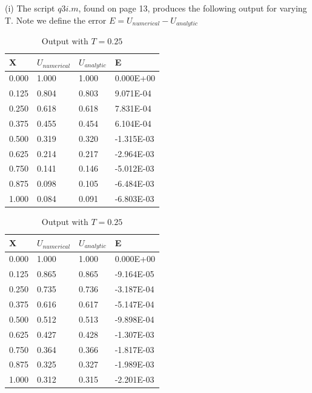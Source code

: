 \documentclass[10pt,a4paper]{report}
\begin{document}
(i) The script $q3i.m$, found on page 13, produces the following output for varying T. Note we define the error $E=U_{numerical}-U_{analytic}$
\begin{table}[h]
\begin{minipage}[b]{0.5\linewidth}
\centering

\begin{tabular}{|l|l|l|l|}
\hline
X & $U_{numerical}$ & $U_{analytic}$ & E \\ \hline
0.000      & 1.000       & 1.000  & 0.000E+00            \\ \hline
0.125      & 0.804       & 0.803  & 9.071E-04            \\ \hline
0.250      & 0.618       & 0.618  & 7.831E-04            \\ \hline
0.375      & 0.455       & 0.454  & 6.104E-04            \\ \hline
0.500      & 0.319       & 0.320  & -1.315E-03           \\ \hline
0.625      & 0.214       & 0.217  & -2.964E-03           \\ \hline
0.750      & 0.141       & 0.146  & -5.012E-03           \\ \hline
0.875      & 0.098       & 0.105  & -6.484E-03           \\ \hline
1.000      & 0.084       & 0.091  & -6.803E-03           \\ \hline
\end{tabular}

\caption{Output with $T=0.125$}
\end{minipage}
\hspace{0.5cm}
\begin{minipage}[b]{0.5\linewidth}
\centering
\begin{tabular}{|l|l|l|l|}
\hline
X & $U_{numerical}$ & $U_{analytic}$ & E \\ \hline
0.000      & 1.000       & 1.000  & 0.000E+00            \\ \hline
0.125      & 0.865       & 0.865  & -9.164E-05           \\ \hline
0.250      & 0.735       & 0.736  & -3.187E-04           \\ \hline
0.375      & 0.616       & 0.617  & -5.147E-04           \\ \hline
0.500      & 0.512       & 0.513  & -9.898E-04           \\ \hline
0.625      & 0.427       & 0.428  & -1.307E-03           \\ \hline
0.750      & 0.364       & 0.366  & -1.817E-03           \\ \hline
0.875      & 0.325       & 0.327  & -1.989E-03           \\ \hline
1.000      & 0.312       & 0.315  & -2.201E-03           \\ \hline
\end{tabular}
\caption{Output with $T=0.25$}
\end{minipage}
\end{table}
\end{document}
